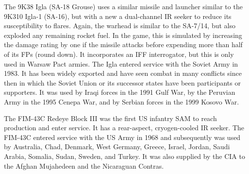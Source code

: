 The 9K38 Igla (SA-18 Grouse) uses a similar missile and launcher similar to the 9K310 Igla-1 (SA-16), but with a new a dual-channel IR seeker to reduce its susceptibility to flares.
Again, the warhead is similar to the SA-7/14, but also exploded any remaining rocket fuel.
In the game, this is simulated by increasing the damage rating by one if the missile attacks before expending more than half of its FPs (round down).
It incorporates an IFF interrogator, but this is only used in Warsaw Pact armies.
The Igla entered service with the Soviet Army in 1983.
It has been widely exported and have seen combat in many conflicts since then in which the Soviet Union or its successor states have been participants or supporters.
It was used by Iraqi forces in the 1991 Gulf War, by the Peruvian Army in the 1995 Cenepa War, and by Serbian forces in the 1999 Kosovo War.%


The FIM-43C Redeye Block III was the first US infantry SAM to reach production and enter service.
It has a rear-aspect, cryogen-cooled IR seeker.
The FIM-43C entered service with the US Army in 1968 and subsequently was used by Australia, Chad, Denmark, West Germany, Greece, Israel, Jordan, Saudi Arabia, Somalia, Sudan, Sweden, and Turkey. It was also supplied by the CIA to the Afghan Mujahedeen and the Nicaraguan Contras.%


